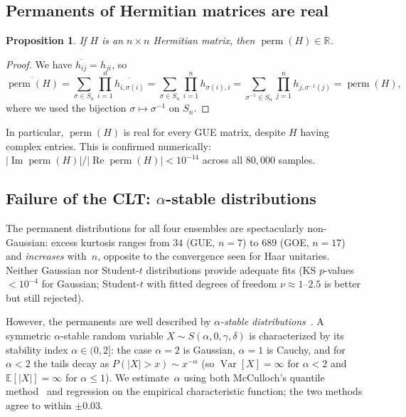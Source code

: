 \documentclass[11pt]{amsart}
\newtheorem{proposition}[theorem]{Proposition}
\theoremstyle{definition}
\theoremstyle{remark}
\DeclareMathOperator{\perm}{perm}
\begin{document}
\subsection{Permanents of Hermitian matrices are real}

\begin{proposition}\label{prop:herm-real}
If $H$ is an $n\times n$ Hermitian matrix, then $\perm(H)\in\mathbb{R}$.
\end{proposition}

\begin{proof}
We have $\overline{h_{ij}}=h_{ji}$, so
\[
  \overline{\perm(H)}
  = \sum_{\sigma\in S_n}\prod_{i=1}^n \overline{h_{i,\sigma(i)}}
  = \sum_{\sigma\in S_n}\prod_{i=1}^n h_{\sigma(i),i}
  = \sum_{\sigma^{-1}\in S_n}\prod_{j=1}^n h_{j,\sigma^{-1}(j)}
  = \perm(H),
\]
where we used the bijection $\sigma\mapsto\sigma^{-1}$ on $S_n$.
\end{proof}

In particular, $\perm(H)$ is real for every GUE matrix, despite $H$
having complex entries.  This is confirmed numerically:
$|\operatorname{Im}\perm(H)|/|\operatorname{Re}\perm(H)|<10^{-14}$
across all $80{,}000$ samples.

\subsection{Failure of the CLT: $\alpha$-stable distributions}

The permanent distributions for all four ensembles are spectacularly
non-Gaussian: excess kurtosis ranges from $34$ (GUE, $n=7$) to $689$
(GOE, $n=17$) and \emph{increases} with~$n$, opposite to the
convergence seen for Haar unitaries.  Neither Gaussian nor Student-$t$
distributions provide adequate fits (KS $p$-values $<10^{-4}$ for
Gaussian; Student-$t$ with fitted degrees of freedom
$\nu\approx 1$--$2.5$ is better but still rejected).

However, the permanents are well described by \emph{$\alpha$-stable
distributions}~\cite{SamorodNolan}.  A symmetric $\alpha$-stable
random variable $X\sim S(\alpha,0,\gamma,\delta)$ is characterized by
its stability index $\alpha\in(0,2]$: the case $\alpha=2$ is
Gaussian, $\alpha=1$ is Cauchy, and for $\alpha<2$ the tails decay as
$P(|X|>x)\sim x^{-\alpha}$ (so $\operatorname{Var}[X]=\infty$ for
$\alpha<2$ and $\mathbb{E}[|X|]=\infty$ for $\alpha\le 1$).  We
estimate~$\alpha$ using both McCulloch's quantile
method~\cite{McCulloch86} and regression on the empirical
characteristic function; the two methods agree to within $\pm 0.03$.
\end{document}
